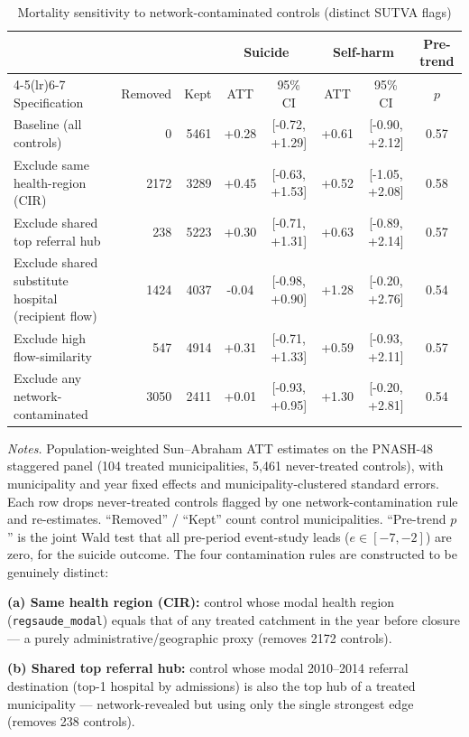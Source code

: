 \begin{table}[!htbp]\centering
\begin{threeparttable}
\caption{Mortality sensitivity to network-contaminated controls (distinct SUTVA flags)}
\label{tab:spillover-sensitivity}
\small
\setlength{\tabcolsep}{4pt}
\begin{tabular}{lrrcccc c}
\toprule
 & & & \multicolumn{2}{c}{Suicide} & \multicolumn{2}{c}{Self-harm} & Pre-trend \\
\cmidrule(lr){4-5}\cmidrule(lr){6-7}
Specification & Removed & Kept & ATT & 95\% CI & ATT & 95\% CI & $p$ \\
\midrule
Baseline (all controls) & 0 & 5461 & +0.28 & [-0.72, +1.29] & +0.61 & [-0.90, +2.12] & 0.57 \\
Exclude same health-region (CIR) & 2172 & 3289 & +0.45 & [-0.63, +1.53] & +0.52 & [-1.05, +2.08] & 0.58 \\
Exclude shared top referral hub & 238 & 5223 & +0.30 & [-0.71, +1.31] & +0.63 & [-0.89, +2.14] & 0.57 \\
Exclude shared substitute hospital (recipient flow) & 1424 & 4037 & -0.04 & [-0.98, +0.90] & +1.28 & [-0.20, +2.76] & 0.54 \\
Exclude high flow-similarity & 547 & 4914 & +0.31 & [-0.71, +1.33] & +0.59 & [-0.93, +2.11] & 0.57 \\
Exclude any network-contaminated & 3050 & 2411 & +0.01 & [-0.93, +0.95] & +1.30 & [-0.20, +2.81] & 0.54 \\
\bottomrule
\end{tabular}
\begin{tablenotes}[flushleft]\footnotesize
\item \textit{Notes.} Population-weighted Sun--Abraham ATT estimates on the PNASH-48 staggered panel (104 treated municipalities, 5{,}461 never-treated controls), with municipality and year fixed effects and municipality-clustered standard errors. Each row drops never-treated controls flagged by one network-contamination rule and re-estimates. ``Removed'' / ``Kept'' count control municipalities. ``Pre-trend $p$'' is the joint Wald test that all pre-period event-study leads ($e\in[-7,-2]$) are zero, for the suicide outcome. The four contamination rules are constructed to be genuinely distinct:
\item \textbf{(a) Same health region (CIR):} control whose modal health region (\texttt{regsaude\_modal}) equals that of any treated catchment in the year before closure --- a purely administrative/geographic proxy (removes 2172 controls).
\item \textbf{(b) Shared top referral hub:} control whose modal 2010--2014 referral destination (top-1 hospital by admissions) is also the top hub of a treated municipality --- network-revealed but using only the single strongest edge (removes 238 controls).

\end{tablenotes}
\end{threeparttable}
\end{table}
